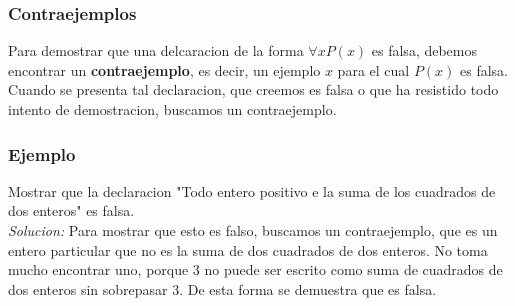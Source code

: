 \documentclass[]{article}
\begin{document}
\subsubsection*{Contraejemplos}

Para demostrar que una delcaracion de la forma $\forall xP(x)$ es falsa, debemos encontrar un \textbf{contraejemplo}, es decir, un ejemplo $x$ para el cual $P(x)$ es falsa. Cuando se presenta tal declaracion, que creemos es falsa o que ha resistido todo intento de demostracion, buscamos un contraejemplo.

\subsubsection*{Ejemplo}

Mostrar que la declaracion "Todo entero positivo e la suma de los cuadrados de dos enteros" es falsa.\\
\textit{Solucion:} Para mostrar que esto es falso, buscamos un contraejemplo, que es un entero particular que no es la suma de dos cuadrados de dos enteros. No toma mucho encontrar uno, porque $3$ no puede ser escrito como suma de cuadrados de  dos enteros sin sobrepasar $3$. De esta forma se demuestra que es falsa.
\end{document}
